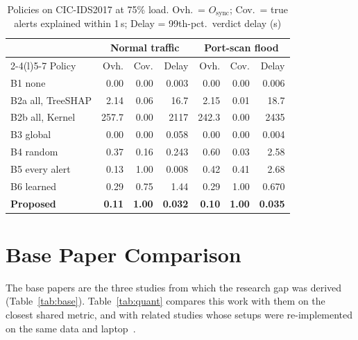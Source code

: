 \documentclass[pdflatex,iicol,sn-mathphys-num]{sn-jnl}
\begin{document}
\begin{table}[!t]
\caption{Policies on CIC-IDS2017 at 75\% load. Ovh.\ = $O_{\mathrm{sync}}$; Cov.\ = true alerts explained within 1\,s; Delay = 99th-pct.\ verdict delay (s)}\label{tab:stream}
\setlength{\tabcolsep}{1pt}
\begin{tabular*}{\columnwidth}{@{\extracolsep\fill}lrrrrrr@{}}
\toprule
 & \multicolumn{3}{c}{Normal traffic} & \multicolumn{3}{c}{Port-scan flood} \\
\cmidrule(lr){2-4}\cmidrule(l){5-7}
Policy & Ovh. & Cov. & Delay & Ovh. & Cov. & Delay \\
\midrule
B1 none & 0.00 & 0.00 & 0.003 & 0.00 & 0.00 & 0.006 \\
B2a all, TreeSHAP & 2.14 & 0.06 & 16.7 & 2.15 & 0.01 & 18.7 \\
B2b all, Kernel & 257.7 & 0.00 & 2117 & 242.3 & 0.00 & 2435 \\
B3 global & 0.00 & 0.00 & 0.058 & 0.00 & 0.00 & 0.004 \\
B4 random & 0.37 & 0.16 & 0.243 & 0.60 & 0.03 & 2.58 \\
B5 every alert & 0.13 & 1.00 & 0.008 & 0.42 & 0.41 & 2.68 \\
B6 learned & 0.29 & 0.75 & 1.44 & 0.29 & 1.00 & 0.670 \\
\textbf{Proposed} & \textbf{0.11} & \textbf{1.00} & \textbf{0.032} & \textbf{0.10} & \textbf{1.00} & \textbf{0.035} \\
\bottomrule
\end{tabular*}
\end{table}

\section{Base Paper Comparison}\label{sec:compare}

The base papers are the three studies from which the research gap was derived (Table~\ref{tab:base}). Table~\ref{tab:quant} compares this work with them on the closest shared metric, and with related studies whose setups were re-implemented on the same data and laptop~\cite{p2,p5,p6,p9,vitorino2024}.
\end{document}
